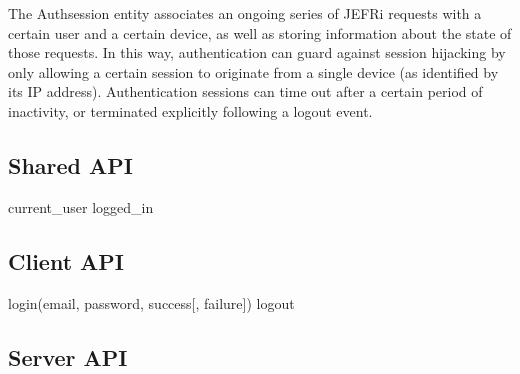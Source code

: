 \documentclass{article}
\begin{document}
The Authsession entity associates an ongoing series of JEFRi requests with a
certain user and a certain device, as well as storing information about the
state of those requests. In this way, authentication can guard against session
hijacking by only allowing a certain session to originate from a single device
(as identified by its IP address). Authentication sessions can time out after a
certain period of inactivity, or terminated explicitly following a logout event.

\subsection{Shared API}
current\_user
logged\_in

\subsection{Client API}
login(email, password, success[, failure])
logout

\subsection{Server API}
\end{document}
